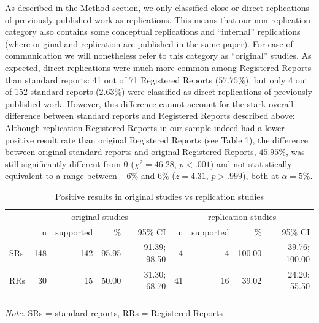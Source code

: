 \documentclass[british,,jou,floatsintext]{apa6}
\begin{document}
As described in the Method section, we only classified close or direct replications of previously published work as replications.
This means that our non-replication category also contains some conceptual replications and \enquote{internal} replications (where original and replication are published in the same paper).
For ease of communication we will nonetheless refer to this category as \enquote{original} studies.
As expected, direct replications were much more common among Registered Reports than standard reports: 41 out of 71 Registered Reports (\(57.75\%\)), but only 4 out of 152 standard reports (\(2.63\%\)) were classified as direct replications of previously published work.
However, this difference cannot account for the stark overall difference between standard reports and Registered Reports described above:
Although replication Registered Reports in our sample indeed had a lower positive result rate than original Registered Reports (see Table 1), the difference between original standard reports and original Registered Reports, \(45.95\%\), was still significantly different from 0 (\(\chi^2 = 46.28\), \(p < .001\)) and not statistically equivalent to a range between \(-6\%\) and \(6\%\) (\(z = 4.31\), \(p > .999\)), both at \(\alpha = 5\%\).



\begin{table}[tbp]

\begin{center}
\begin{threeparttable}

\caption{\label{tab:unnamed-chunk-4}Positive results in original studies vs replication studies}

\begin{tabular}{lrrrrrrrr}
\toprule
 & \multicolumn{4}{c}{original studies} & \multicolumn{4}{c}{replication studies} \\
\cmidrule(r){2-5} \cmidrule(r){6-9}
 & n & supported & \% & 95\% CI & n & supported & \% & 95\% CI\\
\midrule
SRs & 148 & 142 & 95.95 & 91.39; 98.50 & 4 & 4 & 100.00 & 39.76; 100.00\\
RRs & 30 & 15 & 50.00 & 31.30; 68.70 & 41 & 16 & 39.02 & 24.20; 55.50\\
\bottomrule
\addlinespace
\end{tabular}

\begin{tablenotes}[para]
\normalsize{\textit{Note.} SRs = standard reports, RRs = Registered Reports}
\end{tablenotes}

\end{threeparttable}
\end{center}

\end{table}
\end{document}
